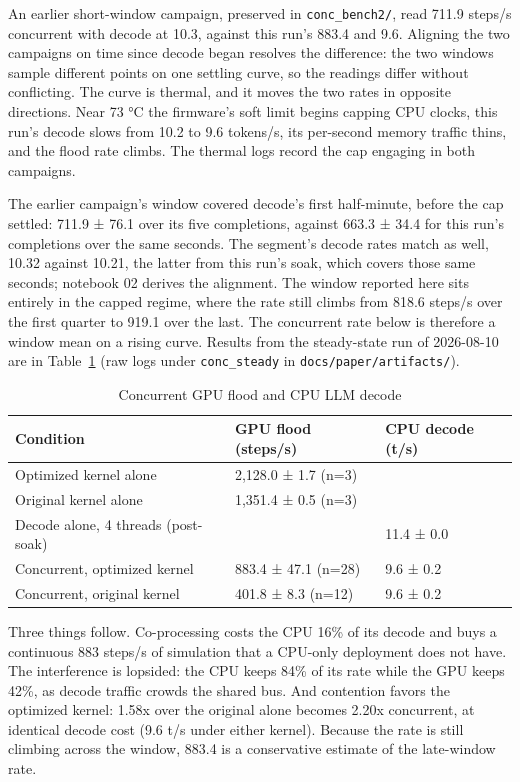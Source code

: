 \documentclass[conference]{IEEEtran}
\begin{document}
An earlier short-window campaign, preserved in \texttt{conc\_bench2/},
read 711.9 steps/s concurrent with decode at 10.3, against this run's
883.4 and 9.6. Aligning the two campaigns on time since decode began
resolves the difference: the two windows sample different points on one
settling curve, so the readings differ without conflicting. The curve is
thermal, and it moves the two rates in opposite directions. Near 73 °C
the firmware's soft limit begins capping CPU clocks, this run's decode
slows from 10.2 to 9.6 tokens/s, its per-second memory traffic thins,
and the flood rate climbs. The thermal logs record the cap engaging in
both campaigns.

The earlier campaign's window covered decode's first half-minute, before
the cap settled: 711.9 ± 76.1 over its five completions, against 663.3 ±
34.4 for this run's completions over the same seconds. The segment's
decode rates match as well, 10.32 against 10.21, the latter from this
run's soak, which covers those same seconds; notebook 02 derives the
alignment. The window reported here sits entirely in the capped regime,
where the rate still climbs from 818.6 steps/s over the first quarter to
919.1 over the last. The concurrent rate below is therefore a window
mean on a rising curve. Results from the steady-state run of 2026-08-10
are in Table~\ref{tab:conc} (raw logs under
\texttt{conc\_steady} in \texttt{docs/paper/artifacts/}).

{\def\LTcaptype{none} %
\begin{table}[!t]\caption{Concurrent GPU flood and CPU LLM decode}\label{tab:conc}\centering\footnotesize\setlength{\tabcolsep}{2.5pt}\renewcommand{\arraystretch}{1.15}\begin{tabular}{@{}lll@{}}
\toprule
Condition & GPU flood (steps/s) & CPU decode (t/s) \\
\midrule
Optimized kernel alone & 2,128.0 ± 1.7 (n=3) & \\
Original kernel alone & 1,351.4 ± 0.5 (n=3) & \\
Decode alone, 4 threads (post-soak) & & 11.4 ± 0.0 \\
Concurrent, optimized kernel & 883.4 ± 47.1 (n=28) & 9.6 ± 0.2 \\
Concurrent, original kernel & 401.8 ± 8.3 (n=12) & 9.6 ± 0.2 \\
\bottomrule
\end{tabular}\end{table}
}

Three things follow. Co-processing costs the CPU 16\% of its decode and
buys a continuous 883 steps/s of simulation that a CPU-only deployment
does not have. The interference is lopsided: the CPU keeps 84\% of its
rate while the GPU keeps 42\%, as decode traffic crowds the shared bus.
And contention favors the optimized kernel: 1.58x over the original
alone becomes 2.20x concurrent, at identical decode cost (9.6 t/s under
either kernel). Because the rate is still climbing across the window,
883.4 is a conservative estimate of the late-window rate.
\end{document}
